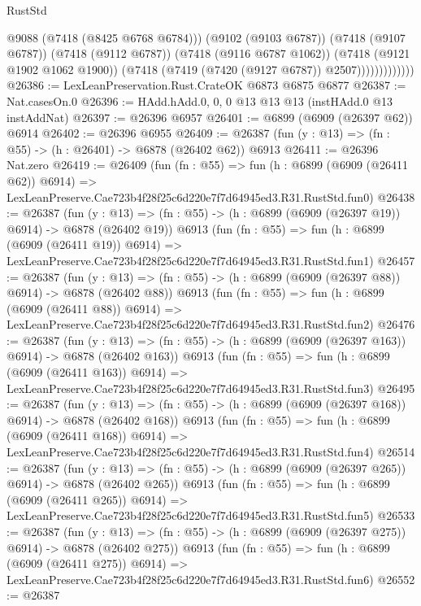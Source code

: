 \begin{lexlean}{RustStd}
\begin{coremodule}
                            @9088
                            (@7418 (@8425 @6768 @6784)))
                          (@9102 (@9103 @6787))
                          (@7418 (@9107 @6787))
                          (@7418 (@9112 @6787))
                          (@7418 (@9116 @6787 @1062))
                          (@7418 (@9121 @1902 @1062 @1900))
                          (@7418 (@7419 (@7420 (@9127 @6787)) @2507)))))))))))))
@26386 := LexLeanPreservation.Rust.CrateOK @6873 @6875 @6877
@26387 := Nat.casesOn.{0}
@26396 := HAdd.hAdd.{0, 0, 0} @13 @13 @13 (instHAdd.{0} @13 instAddNat)
@26397 := @26396 @6957
@26401 := @6899 (@6909 (@26397 @62)) @6914
@26402 := @26396 @6955
@26409 := @26387 (fun (y : @13) => (fn : @55) -> (h : @26401) -> @6878 (@26402 @62)) @6913
@26411 := @26396 Nat.zero
@26419 := @26409
    (fun (fn : @55) =>
    fun (h : @6899 (@6909 (@26411 @62)) @6914) =>
    LexLeanPreserve.Cae723b4f28f25c6d220e7f7d64945ed3.R31.RustStd.fun0)
@26438 := @26387
    (fun (y : @13) => (fn : @55) -> (h : @6899 (@6909 (@26397 @19)) @6914) -> @6878 (@26402 @19))
    @6913
    (fun (fn : @55) =>
    fun (h : @6899 (@6909 (@26411 @19)) @6914) =>
    LexLeanPreserve.Cae723b4f28f25c6d220e7f7d64945ed3.R31.RustStd.fun1)
@26457 := @26387
    (fun (y : @13) => (fn : @55) -> (h : @6899 (@6909 (@26397 @88)) @6914) -> @6878 (@26402 @88))
    @6913
    (fun (fn : @55) =>
    fun (h : @6899 (@6909 (@26411 @88)) @6914) =>
    LexLeanPreserve.Cae723b4f28f25c6d220e7f7d64945ed3.R31.RustStd.fun2)
@26476 := @26387
    (fun (y : @13) => (fn : @55) -> (h : @6899 (@6909 (@26397 @163)) @6914) -> @6878 (@26402 @163))
    @6913
    (fun (fn : @55) =>
    fun (h : @6899 (@6909 (@26411 @163)) @6914) =>
    LexLeanPreserve.Cae723b4f28f25c6d220e7f7d64945ed3.R31.RustStd.fun3)
@26495 := @26387
    (fun (y : @13) => (fn : @55) -> (h : @6899 (@6909 (@26397 @168)) @6914) -> @6878 (@26402 @168))
    @6913
    (fun (fn : @55) =>
    fun (h : @6899 (@6909 (@26411 @168)) @6914) =>
    LexLeanPreserve.Cae723b4f28f25c6d220e7f7d64945ed3.R31.RustStd.fun4)
@26514 := @26387
    (fun (y : @13) => (fn : @55) -> (h : @6899 (@6909 (@26397 @265)) @6914) -> @6878 (@26402 @265))
    @6913
    (fun (fn : @55) =>
    fun (h : @6899 (@6909 (@26411 @265)) @6914) =>
    LexLeanPreserve.Cae723b4f28f25c6d220e7f7d64945ed3.R31.RustStd.fun5)
@26533 := @26387
    (fun (y : @13) => (fn : @55) -> (h : @6899 (@6909 (@26397 @275)) @6914) -> @6878 (@26402 @275))
    @6913
    (fun (fn : @55) =>
    fun (h : @6899 (@6909 (@26411 @275)) @6914) =>
    LexLeanPreserve.Cae723b4f28f25c6d220e7f7d64945ed3.R31.RustStd.fun6)
@26552 := @26387

\end{coremodule}
\end{lexlean}
